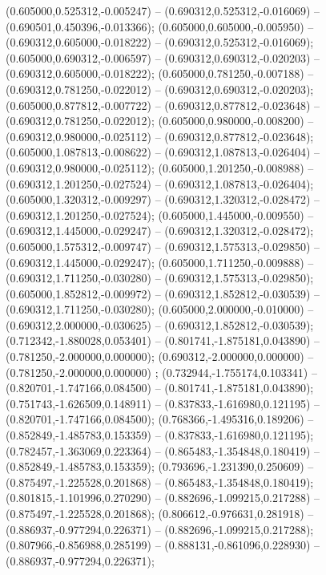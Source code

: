  (0.605000,0.525312,-0.005247) -- (0.690312,0.525312,-0.016069) -- (0.690501,0.450396,-0.013366);
 (0.605000,0.605000,-0.005950) -- (0.690312,0.605000,-0.018222) -- (0.690312,0.525312,-0.016069);
 (0.605000,0.690312,-0.006597) -- (0.690312,0.690312,-0.020203) -- (0.690312,0.605000,-0.018222);
 (0.605000,0.781250,-0.007188) -- (0.690312,0.781250,-0.022012) -- (0.690312,0.690312,-0.020203);
 (0.605000,0.877812,-0.007722) -- (0.690312,0.877812,-0.023648) -- (0.690312,0.781250,-0.022012);
 (0.605000,0.980000,-0.008200) -- (0.690312,0.980000,-0.025112) -- (0.690312,0.877812,-0.023648);
 (0.605000,1.087813,-0.008622) -- (0.690312,1.087813,-0.026404) -- (0.690312,0.980000,-0.025112);
 (0.605000,1.201250,-0.008988) -- (0.690312,1.201250,-0.027524) -- (0.690312,1.087813,-0.026404);
 (0.605000,1.320312,-0.009297) -- (0.690312,1.320312,-0.028472) -- (0.690312,1.201250,-0.027524);
 (0.605000,1.445000,-0.009550) -- (0.690312,1.445000,-0.029247) -- (0.690312,1.320312,-0.028472);
 (0.605000,1.575312,-0.009747) -- (0.690312,1.575313,-0.029850) -- (0.690312,1.445000,-0.029247);
 (0.605000,1.711250,-0.009888) -- (0.690312,1.711250,-0.030280) -- (0.690312,1.575313,-0.029850);
 (0.605000,1.852812,-0.009972) -- (0.690312,1.852812,-0.030539) -- (0.690312,1.711250,-0.030280);
 (0.605000,2.000000,-0.010000) -- (0.690312,2.000000,-0.030625) -- (0.690312,1.852812,-0.030539);
 (0.712342,-1.880028,0.053401) -- (0.801741,-1.875181,0.043890) -- (0.781250,-2.000000,0.000000);
 (0.690312,-2.000000,0.000000) -- (0.781250,-2.000000,0.000000) ;
 (0.732944,-1.755174,0.103341) -- (0.820701,-1.747166,0.084500) -- (0.801741,-1.875181,0.043890);
 (0.751743,-1.626509,0.148911) -- (0.837833,-1.616980,0.121195) -- (0.820701,-1.747166,0.084500);
 (0.768366,-1.495316,0.189206) -- (0.852849,-1.485783,0.153359) -- (0.837833,-1.616980,0.121195);
 (0.782457,-1.363069,0.223364) -- (0.865483,-1.354848,0.180419) -- (0.852849,-1.485783,0.153359);
 (0.793696,-1.231390,0.250609) -- (0.875497,-1.225528,0.201868) -- (0.865483,-1.354848,0.180419);
 (0.801815,-1.101996,0.270290) -- (0.882696,-1.099215,0.217288) -- (0.875497,-1.225528,0.201868);
 (0.806612,-0.976631,0.281918) -- (0.886937,-0.977294,0.226371) -- (0.882696,-1.099215,0.217288);
 (0.807966,-0.856988,0.285199) -- (0.888131,-0.861096,0.228930) -- (0.886937,-0.977294,0.226371);
